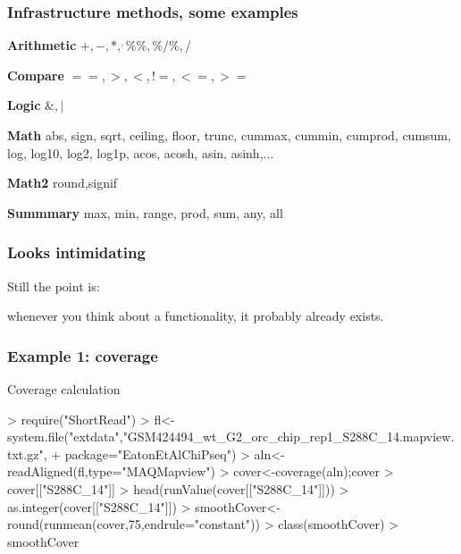 \documentclass{beamer}
\begin{document}

\begin{frame}
\frametitle{Infrastructure methods, some examples}
 \bit
    \item \textbf{Arithmetic}  $+,-,*,^,\%\%,\% /\%,/$
    \item \textbf{Compare}
    $==,>,<,!=,<=,>=$
    \item \textbf{Logic}
    $\& ,| $
    \item \textbf{Math}
    abs, sign, sqrt, ceiling, floor, trunc, cummax, cummin, cumprod, cumsum, log, log10, log2, log1p, acos, acosh, asin, asinh,...
    \item \textbf{Math2}
    round,signif
    \item \textbf{Summmary}
    max, min, range, prod, sum, any, all
 \eit
\end{frame}


\begin{frame}
\frametitle{Looks intimidating}
 \bit
    \item Still the point is:
      \bit
	        \item whenever you think about a functionality, it probably already exists.
      \eit
 \eit

\end{frame}


\begin{frame}[fragile]
\frametitle{Example 1: coverage}
  \bit
      \item Coverage calculation
  \eit
  \begin{uncoverenv}
\begin{Schunk}
\begin{Sinput}
> require("ShortRead")
> fl<-system.file("extdata","GSM424494_wt_G2_orc_chip_rep1_S288C_14.mapview.txt.gz",
+                 package="EatonEtAlChiPseq")
> aln<-readAligned(fl,type="MAQMapview")
> cover<-coverage(aln);cover
> cover[["S288C_14"]]
> head(runValue(cover[["S288C_14"]]))
> as.integer(cover[["S288C_14"]])
> smoothCover<-round(runmean(cover,75,endrule="constant"))
> class(smoothCover)
> smoothCover
\end{Sinput}
\end{Schunk}
 \end{uncoverenv}
\end{frame}
\end{document}
